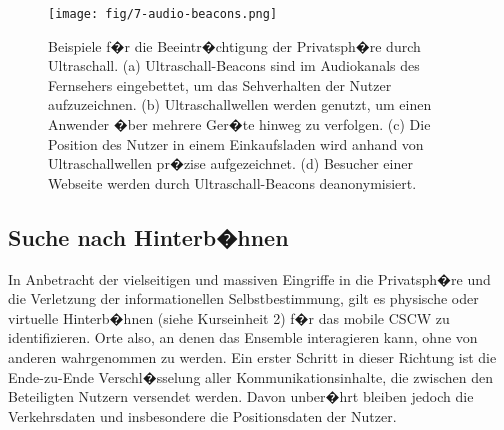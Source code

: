 \begin{figure}[H]
\centering
\texttt{[image: fig/7-audio-beacons.png]}
\caption{Beispiele f�r die Beeintr�chtigung der Privatsph�re durch Ultraschall. 
(a) Ultraschall-Beacons sind im Audiokanals des Fernsehers eingebettet, um das Sehverhalten der Nutzer aufzuzeichnen.
(b) Ultraschallwellen werden genutzt, um einen Anwender �ber mehrere Ger�te hinweg zu verfolgen.%
(c) Die Position des Nutzer in einem Einkaufsladen wird anhand von Ultraschallwellen pr�zise aufgezeichnet. %
(d) Besucher einer Webseite werden durch Ultraschall-Beacons deanonymisiert.%
\cite{Quiring2017}}
\label{fig:audiobeacons}
\end{figure}


\begin{comment}
yyy: example
Facbook mobile targetting, 
John Lanchester: Du bist das Produkt
DLF Essay und Diskurs: 
\end{comment}





\subsection{Suche nach Hinterb�hnen}
In Anbetracht der vielseitigen und massiven Eingriffe in die Privatsph�re und die Verletzung der informationellen Selbstbestimmung, gilt es physische oder virtuelle Hinterb�hnen (siehe Kurseinheit 2) f�r das mobile CSCW zu identifizieren. Orte also, an denen das Ensemble interagieren kann, ohne von anderen wahrgenommen zu werden. Ein erster Schritt in dieser Richtung ist die Ende-zu-Ende Verschl�sselung aller Kommunikationsinhalte, die zwischen den Beteiligten Nutzern versendet werden. Davon unber�hrt bleiben jedoch die Verkehrsdaten und insbesondere die Positionsdaten der Nutzer. 


